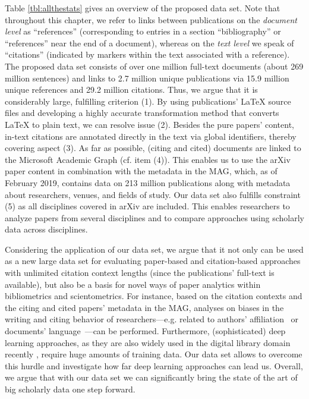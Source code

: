 Table \ref{tbl:allthestats} gives an overview of the proposed data set. Note that throughout this chapter, we refer to links between publications on the \emph{document level} as ``references'' (corresponding to entries in a section ``bibliography'' or ``references'' near the end of a document), whereas on the \emph{text level} we speak of ``citations'' (indicated by markers within the text associated with a reference). The proposed data set consists of over one million full-text documents (about 269 million sentences) and links to 2.7 million unique publications via 15.9 million unique references and 29.2 million citations.
Thus, we argue that it is considerably large, fulfilling criterion (1). By using publications' \LaTeX{} source files and developing a highly accurate transformation method that converts \LaTeX{} to plain text, we can resolve issue (2). Besides the pure papers' content, in-text citations are annotated directly in the text via global identifiers, thereby covering aspect (3). As far as possible, (citing and cited) documents are linked to the Microsoft Academic Graph \cite{Sinha2015MAG} (cf. item (4)). This enables us to use the arXiv paper content in combination with the metadata in the MAG, which, as of February 2019, contains data on 213 million publications along with metadata about researchers, venues, and fields of study. Our data set also fulfills constraint (5) as all disciplines covered in arXiv are included. This enables researchers to analyze papers from several disciplines and to compare approaches using scholarly data across disciplines.

Considering the application of our data set, we argue that it not only can be used as a new large data set for evaluating paper-based and citation-based approaches with unlimited citation context lengths (since the publications' full-text is available),
but also be a basis for novel ways of paper analytics within bibliometrics and scientometrics. For instance, based on the citation contexts and the citing and cited papers' metadata in the MAG, analyses on biases in the writing and citing behavior of researchers---e.g. related to authors' affiliation~\cite{Reingewertz2018} or documents' language~\cite{Liang2013,Liu2018}---can be performed.
Furthermore, (sophisticated) deep learning approaches, as they are also widely used in the digital library domain recently \cite{Ebensu2017}, require huge amounts of training data. Our data set allows to overcome this hurdle and investigate how far deep learning approaches can lead us.
Overall, we argue that with our data set we can significantly bring the state of the art of big scholarly data one step forward.

